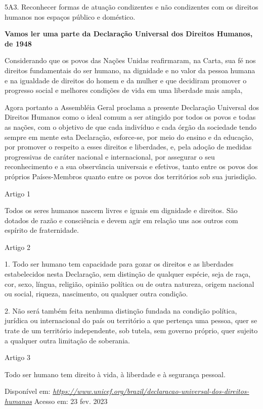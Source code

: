 5A3. Reconhecer formas de atuação condizentes e não condizentes com os
direitos humanos nos espaços público e doméstico.

\textbf{Vamos ler uma parte da Declaração Universal dos Direitos
Humanos, de 1948}

Considerando que os povos das Nações Unidas reafirmaram, na Carta, sua
fé nos direitos fundamentais do ser humano, na dignidade e no valor da
pessoa humana e na igualdade de direitos do homem e da mulher e que
decidiram promover o progresso social e melhores condições de vida em
uma liberdade mais ampla,

Agora portanto a Assembléia Geral proclama a presente Declaração
Universal dos Direitos Humanos como o ideal comum a ser atingido por
todos os povos e todas as nações, com o objetivo de que cada indivíduo e
cada órgão da sociedade tendo sempre em mente esta Declaração,
esforce-se, por meio do ensino e da educação, por promover o respeito a
esses direitos e liberdades, e, pela adoção de medidas progressivas de
caráter nacional e internacional, por assegurar o seu reconhecimento e a
sua observância universais e efetivos, tanto entre os povos dos próprios
Países-Membros quanto entre os povos dos territórios sob sua jurisdição.

Artigo 1

Todos os seres humanos nascem livres e iguais em dignidade e direitos.
São dotados de razão e consciência e devem agir em relação uns aos
outros com espírito de fraternidade.

Artigo 2

1. Todo ser humano tem capacidade para gozar os direitos e as liberdades
estabelecidos nesta Declaração, sem distinção de qualquer espécie, seja
de raça, cor, sexo, língua, religião, opinião política ou de outra
natureza, origem nacional ou social, riqueza, nascimento, ou qualquer
outra condição.

2. Não será também feita nenhuma distinção fundada na condição política,
jurídica ou internacional do país ou território a que pertença uma
pessoa, quer se trate de um território independente, sob tutela, sem
governo próprio, quer sujeito a qualquer outra limitação de soberania.

Artigo 3

Todo ser humano tem direito à vida, à liberdade e à segurança pessoal.

Disponível em:
\href{https://www.unicef.org/brazil/declaracao-universal-dos-direitos-humanos}{\emph{https://www.unicef.org/brazil/declaracao-universal-dos-direitos-humanos}}
Acesso em: 23 fev. 2023

